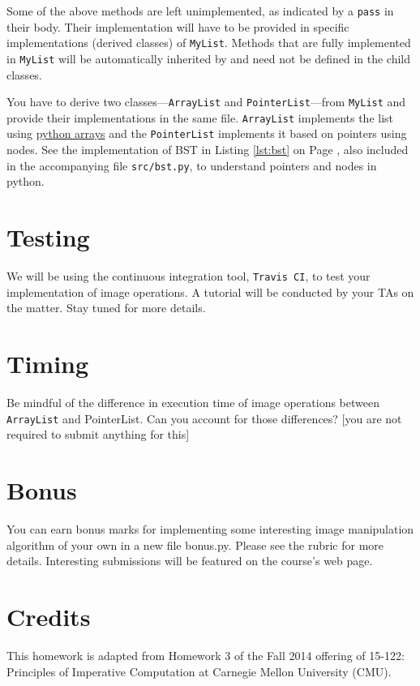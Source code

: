 \documentclass[addpoints]{exam}
\begin{document}
Some of the above methods are left unimplemented, as indicated by a \texttt{pass} in their body. Their implementation will have to be provided in specific implementations (derived classes) of \texttt{MyList}. Methods that are fully implemented in \texttt{MyList} will be automatically inherited by and need not be defined in the child classes.

You have to derive two classes---\texttt{ArrayList} and \texttt{PointerList}---from \texttt{MyList} and provide their implementations in the same file. \texttt{ArrayList} implements the list using \href{https://www.programiz.com/python-programming/array}{python arrays} and the \texttt{PointerList} implements it based on pointers using nodes. See the implementation of BST in Listing \ref{lst:bst} on Page \pageref{lst:bst}, also included in the accompanying file \texttt{src/bst.py}, to understand pointers and nodes in python. 

\section{Testing}
We will be using the continuous integration tool, \texttt{Travis CI}, to test your implementation of image operations. A tutorial will be conducted by your TAs on the matter. Stay tuned for more details.

\section{Timing}

Be mindful of the difference in execution time of image operations between \texttt{ArrayList} and \textsf{PointerList}. Can you account for those differences? [you are not required to submit anything for this]

\section{Bonus}

You can earn bonus marks for implementing some interesting image manipulation algorithm of your own in a new file  \textsf{bonus.py}. Please see the rubric for more details. Interesting submissions will be featured on the course's web page.

\section{Credits}

This homework is adapted from Homework 3 of the Fall 2014 offering of 15-122: Principles of Imperative Computation at Carnegie Mellon University (CMU).
\end{document}
